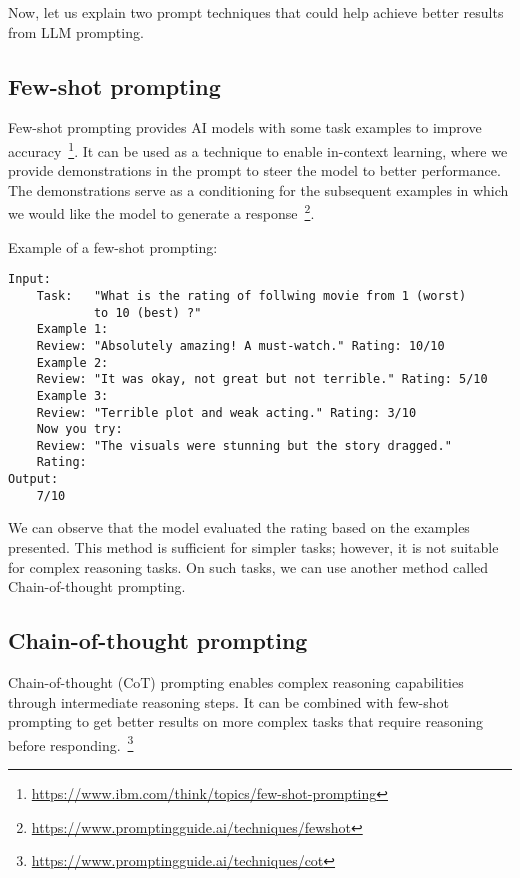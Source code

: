 Now, let us explain two prompt techniques that could help achieve better results from LLM prompting.

\subsection*{Few-shot prompting}
Few-shot prompting provides AI models with some task examples to improve accuracy~\footnote{\url{https://www.ibm.com/think/topics/few-shot-prompting}}. It can be used as a technique to enable in-context learning, where we provide demonstrations in the prompt to steer the model to better performance. The demonstrations serve as a conditioning for the subsequent examples in which we would like the model to generate a response~\footnote{\url{https://www.promptingguide.ai/techniques/fewshot}}.

Example of a few-shot prompting:
\begin{verbatim}
Input:
    Task:   "What is the rating of follwing movie from 1 (worst)
            to 10 (best) ?" 
    Example 1:
    Review: "Absolutely amazing! A must-watch." Rating: 10/10
    Example 2:
    Review: "It was okay, not great but not terrible." Rating: 5/10
    Example 3:
    Review: "Terrible plot and weak acting." Rating: 3/10
    Now you try:
    Review: "The visuals were stunning but the story dragged."
    Rating:
Output:
    7/10
\end{verbatim}

We can observe that the model evaluated the rating based on the examples presented. This method is sufficient for simpler tasks; however, it is not suitable for complex reasoning tasks. On such tasks, we can use another method called Chain-of-thought prompting.

\subsection*{Chain-of-thought prompting}
Chain-of-thought (CoT) prompting enables complex reasoning capabilities through intermediate reasoning steps. It can be combined with few-shot prompting to get better results on more complex tasks that require reasoning before responding.~\footnote{\url{https://www.promptingguide.ai/techniques/cot}}

